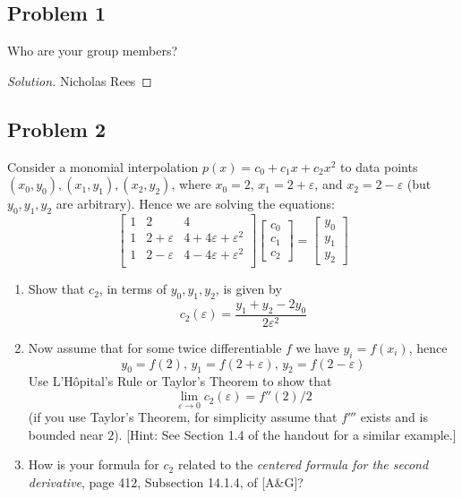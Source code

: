 \documentclass{article}
\newcommand{\ep}{{\varepsilon}}
\begin{document}
\subsection*{Problem 1}
Who are your group members?
\begin{proof}[Solution]\let\qed\relax
	Nicholas Rees
\end{proof}


\subsection*{Problem 2}
Consider a monomial interpolation $p(x) = c_0 + c_1x + c_2x^2$ to data points
$(x_0,y_0),(x_1,y_1),(x_2,y_2)$, where $x_0 = 2$, $x_1 = 2 + \ep$,
and $x_2 = 2 - \ep$ (but $y_0,y_1,y_2$ are arbitrary).
Hence we are solving the equations:
\[
	\begin{bmatrix}
		1 & 2 & 4\\
		1 & 2+\ep & 4+4\ep+\ep^2\\
		1 & 2-\ep & 4-4\ep+\ep^2\\
	\end{bmatrix}
	\begin{bmatrix}
		c_0 \\ c_1 \\ c_2
	\end{bmatrix} =
	\begin{bmatrix}
		y_0 \\ y_1 \\ y_2
	\end{bmatrix}
\]
\begin{enumerate}
	\item Show that $c_2$, in terms of $y_0,y_1,y_2$, is given by
		\begin{equation}\label{c2}
			c_2(\ep) = \frac{y_1 + y_2 - 2y_0}{2\ep^2}
		\end{equation}
	\item Now assume that for some twice differentiable $f$
		we have $y_i = f(x_i)$, hence
		\[
			y_0 = f(2), \, y_1 = f(2 + \ep), \, y_2 = f(2 - \ep)
		\]
		Use L'H\^{o}pital's Rule or Taylor's Theorem to show that
		\[
			\lim_{\ep \to 0} c_2(\ep) = f''(2)/2
		\]
		(if you use Taylor's Theorem, for simplicity assume that $f'''$ exists
		and is bounded near $2$).
		[Hint: See Section 1.4 of the handout for a similar example.]
	\item How is your formula for $c_2$ related to the
		\emph{centered formula for the second derivative},
		page 412, Subsection 14.1.4, of [A\&G]?
\end{enumerate}
\end{document}
